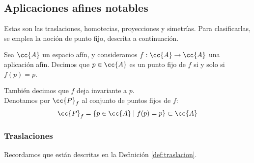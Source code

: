 \subsection{Aplicaciones afines notables}

Estas son las traslaciones, homotecias, proyecciones y simetrías. Para clasificarlas, se emplea la noción de punto fijo, descrita a continuación.
\begin{definicion}
    Sea $\cc{A}$ un espacio afín, y consideramos $f:\cc{A}\to \cc{A}$ una aplicación afín. Decimos que $p\in \cc{A}$ es un punto fijo de $f$ si y solo si $f(p)=p$.

    También decimos que $f$ deja invariante a $p$.\\

    Denotamos por $\cc{P}_f$ al conjunto de puntos fijos de $f$:
    \begin{equation*}
        \cc{P}_f = \{p\in \cc{A}\mid f(p)=p\} \subset \cc{A}
    \end{equation*}
\end{definicion}

\subsubsection{Traslaciones}
Recordamos que están descritas en la Definición \ref{def:traslacion}. 

